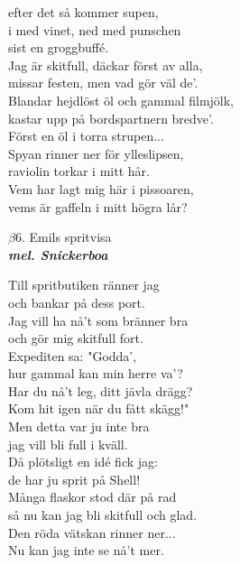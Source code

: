 \documentclass[a6paper,10pt]{article}
\newcommand{\mel}[1]{\small\textbf{\textit{mel. #1 \\}}}
\begin{document}
efter det så kommer supen,\\
i med vinet, ned med punschen\\
sist en groggbuffé.
\vspace{5pt} \\
Jag är skitfull, däckar först av alla,\\
missar festen, men vad gör väl de'.\\
Blandar hejdlöst öl och gammal filmjölk,\\
kastar upp på bordspartnern bredve'.
\vspace{5pt} \\
Först en öl i torra strupen...
\vspace{5pt} \\
Spyan rinner ner för ylleslipsen,\\
raviolin torkar i mitt hår.\\
Vem har lagt mig här i pissoaren,\\
vems är gaffeln i mitt högra lår?

\setlength{\oddsidemargin}{-0.47in}
\begin{center}
\Large $\beta6$. Emils spritvisa \\ 
\mel{Snickerboa}
\end{center}
Till spritbutiken ränner jag \\
och bankar på dess port. \\
Jag vill ha nå't som bränner bra \\
och gör mig skitfull fort. \\
Expediten sa: "Godda', \\
hur gammal kan min herre va'? \\
Har du nå't leg, ditt jävla drägg?\\ 
Kom hit igen när du fått skägg!" \\
\newline
Men detta var ju inte bra \\
jag vill bli full i kväll. \\
Då plötsligt en idé fick jag: \\
de har ju sprit på Shell! \\
Många flaskor stod där på rad \\
så nu kan jag bli skitfull och glad.\\ 
Den röda vätskan rinner ner... \\
Nu kan jag inte se nå't mer. 
\end{document}
